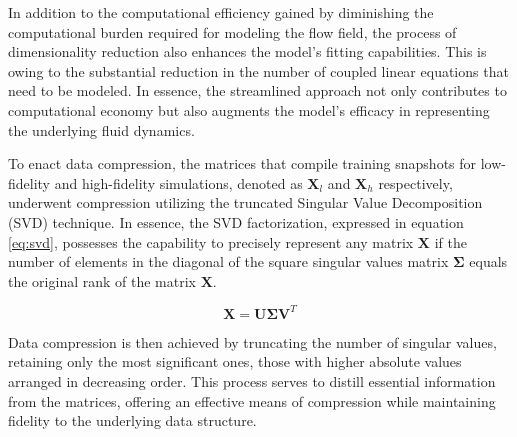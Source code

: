 In addition to the computational efficiency gained by diminishing the computational burden required for modeling the flow field, the process of dimensionality reduction also enhances the model's fitting capabilities. This is owing to the substantial reduction in the number of coupled linear equations that need to be modeled. In essence, the streamlined approach not only contributes to computational economy but also augments the model's efficacy in representing the underlying fluid dynamics.

To enact data compression, the matrices that compile training snapshots for low-fidelity and high-fidelity simulations, denoted as $\mathbf{X}_{l}$ and $\mathbf{X}_h$ respectively, underwent compression utilizing the truncated Singular Value Decomposition (SVD) technique. In essence, the SVD factorization, expressed in equation \ref{eq:svd}, possesses the capability to precisely represent any matrix $\mathbf{X}$ if the number of elements in the diagonal of the square singular values matrix $\mathbf{\Sigma}$ equals the original rank of the matrix $\mathbf{X}$. 

\begin{equation}
    \mathbf{X} = \mathbf{U}\mathbf{\Sigma}\mathbf{V}^T  
    \label{eq:svd}
\end{equation}

Data compression is then achieved by truncating the number of singular values, retaining only the most significant ones, those with higher absolute values arranged in decreasing order. This process serves to distill essential information from the matrices, offering an effective means of compression while maintaining fidelity to the underlying data structure.
